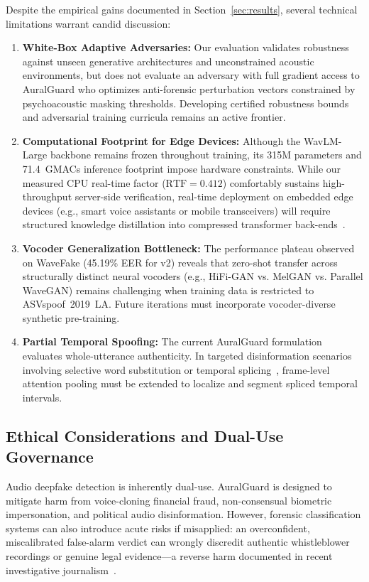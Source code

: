 Despite the empirical gains documented in Section~\ref{sec:results}, several technical limitations warrant candid discussion:
\begin{enumerate}
\item \textbf{White-Box Adaptive Adversaries:} Our evaluation validates robustness against unseen generative architectures and unconstrained acoustic environments, but does not evaluate an adversary with full gradient access to AuralGuard who optimizes anti-forensic perturbation vectors constrained by psychoacoustic masking thresholds. Developing certified robustness bounds and adversarial training curricula remains an active frontier.
\item \textbf{Computational Footprint for Edge Devices:} Although the WavLM-Large backbone remains frozen throughout training, its 315M parameters and 71.4~GMACs inference footprint impose hardware constraints. While our measured CPU real-time factor ($\mathrm{RTF} = 0.412$) comfortably sustains high-throughput server-side verification, real-time deployment on embedded edge devices (e.g., smart voice assistants or mobile transceivers) will require structured knowledge distillation into compressed transformer back-ends~\cite{liu2025nes2net,nagar2026hybrid}.
\item \textbf{Vocoder Generalization Bottleneck:} The performance plateau observed on WaveFake (45.19\% EER for v2) reveals that zero-shot transfer across structurally distinct neural vocoders (e.g., HiFi-GAN vs. MelGAN vs. Parallel WaveGAN) remains challenging when training data is restricted to ASVspoof~2019~LA. Future iterations must incorporate vocoder-diverse synthetic pre-training.
\item \textbf{Partial Temporal Spoofing:} The current AuralGuard formulation evaluates whole-utterance authenticity. In targeted disinformation scenarios involving selective word substitution or temporal splicing~\cite{luong2024llamapartialspoof}, frame-level attention pooling must be extended to localize and segment spliced temporal intervals.
\end{enumerate}

\subsection{Ethical Considerations and Dual-Use Governance}
\label{ssec:ethics}

Audio deepfake detection is inherently dual-use. AuralGuard is designed to mitigate harm from voice-cloning financial fraud, non-consensual biometric impersonation, and political audio disinformation. However, forensic classification systems can also introduce acute risks if misapplied: an overconfident, miscalibrated false-alarm verdict can wrongly discredit authentic whistleblower recordings or genuine legal evidence—a reverse harm documented in recent investigative journalism~\cite{chandra2025deepfakeeval}. 

